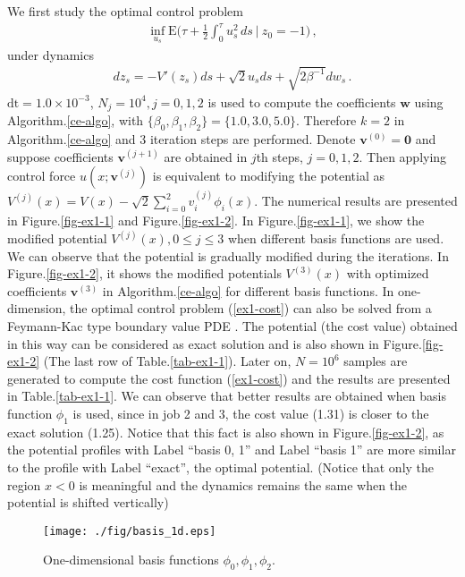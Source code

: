 \documentclass[final]{siamltex}
\begin{document}
We first study the optimal control problem  
\begin{align}
  \inf_{u_s} \mathrm{E} \Big(\tau + \frac{1}{2} \int_0^\tau u_s^2 \,ds~\Big|~
  z_0 = -1\Big)\,,
  \label{ex1-cost}
\end{align}
under dynamics
\begin{align}
  dz_s = - V'(z_s) ds + \sqrt{2}u_s ds + \sqrt{2\beta^{-1}} dw_s\,.
\end{align}
$\mbox{dt} = 1.0 \times 10^{-3}$, $N_j = 10^{4}, j=0,1,2$ is used to compute the
coefficients $\bm{w}$ using Algorithm.\ref{ce-algo}, with $\{\beta_0,\beta_1, \beta_2\}
= \{1.0, 3.0, 5.0\}$.  Therefore $k=2$ in Algorithm.\ref{ce-algo} and $3$
iteration steps are performed. Denote $\bm{v}^{(0)} = \bm{0}$ and suppose
coefficients $\bm{v}^{(j+1)}$ are obtained
in $j$th steps, $j=0,1,2$. Then applying control force $u(x;\bm{v}^{(j)})$ is
equivalent to modifying the potential as $V^{(j)}(x) = V(x) - \sqrt{2}\sum\limits_{i=0}^{2} v^{(j)}_i
\phi_i(x)$. The numerical results are presented in Figure.\ref{fig-ex1-1} and Figure.\ref{fig-ex1-2}.
In Figure.\ref{fig-ex1-1}, we show the modified potential $V^{(j)}(x), 0\le
j\le 3$ when different basis functions are used. We can observe that the potential is
gradually modified during the iterations. In Figure.\ref{fig-ex1-2}, it shows
the modified potentials $V^{(3)}(x)$ with optimized coefficients
$\bm{v}^{(3)}$ in Algorithm.\ref{ce-algo} for different basis functions. In
one-dimension, the optimal control problem (\ref{ex1-cost}) can also be solved
from a Feymann-Kac type boundary value PDE \cite{control_schuette}. The
potential (the cost value) obtained in this way can be considered as exact solution and is also
shown in Figure.\ref{fig-ex1-2} (The last row of Table.\ref{tab-ex1-1}).
Later on, $N = 10^{6}$ samples are generated to compute
the cost function (\ref{ex1-cost}) and the results are presented in
Table.\ref{tab-ex1-1}. We can observe that better results are obtained when basis function
$\phi_1$ is used, since in job 2 and 3, the cost value (1.31) is closer to the exact
solution (1.25). Notice that this fact is also shown in
Figure.\ref{fig-ex1-2}, as the potential profiles with Label ``basis 0, 1'' and
Label ``basis 1'' are more similar to the profile with Label ``exact'', the
optimal potential. (Notice that only the region $x<0$ is meaningful and the dynamics remains the same when
the potential is shifted vertically) 
\begin{figure}[tphb]
  \centering
\texttt{[image: ./fig/basis\_1d.eps]}
\caption{One-dimensional basis functions $\phi_0, \phi_1, \phi_2$. \label{fig-ex1-basis}}
\end{figure}
\end{document}
